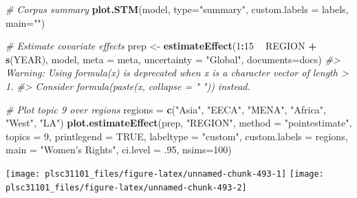 \documentclass[
]{book}
\newenvironment{Shaded}{\begin{snugshade}}{\end{snugshade}}
\newcommand{\CommentTok}[1]{\textcolor[rgb]{0.56,0.35,0.01}{\textit{#1}}}
\newcommand{\DataTypeTok}[1]{\textcolor[rgb]{0.13,0.29,0.53}{#1}}
\newcommand{\DecValTok}[1]{\textcolor[rgb]{0.00,0.00,0.81}{#1}}
\newcommand{\FloatTok}[1]{\textcolor[rgb]{0.00,0.00,0.81}{#1}}
\newcommand{\KeywordTok}[1]{\textcolor[rgb]{0.13,0.29,0.53}{\textbf{#1}}}
\newcommand{\NormalTok}[1]{#1}
\newcommand{\OperatorTok}[1]{\textcolor[rgb]{0.81,0.36,0.00}{\textbf{#1}}}
\newcommand{\OtherTok}[1]{\textcolor[rgb]{0.56,0.35,0.01}{#1}}
\newcommand{\StringTok}[1]{\textcolor[rgb]{0.31,0.60,0.02}{#1}}
\begin{document}
\begin{Shaded}
\begin{Highlighting}[]
\CommentTok{# Corpus summary}
\KeywordTok{plot.STM}\NormalTok{(model, }\DataTypeTok{type=}\StringTok{"summary"}\NormalTok{, }\DataTypeTok{custom.labels =}\NormalTok{ labels, }\DataTypeTok{main=}\StringTok{""}\NormalTok{)}

\CommentTok{# Estimate covariate effects}
\NormalTok{prep <-}\StringTok{ }\KeywordTok{estimateEffect}\NormalTok{(}\DecValTok{1}\OperatorTok{:}\DecValTok{15} \OperatorTok{~}\StringTok{ }\NormalTok{REGION }\OperatorTok{+}\StringTok{ }\KeywordTok{s}\NormalTok{(YEAR), model, }\DataTypeTok{meta =}\NormalTok{ meta, }\DataTypeTok{uncertainty =} \StringTok{"Global"}\NormalTok{, }\DataTypeTok{documents=}\NormalTok{docs)}
\CommentTok{#> Warning: Using formula(x) is deprecated when x is a character vector of length > 1.}
\CommentTok{#>   Consider formula(paste(x, collapse = " ")) instead.}

\CommentTok{# Plot topic 9 over regions}
\NormalTok{regions =}\StringTok{ }\KeywordTok{c}\NormalTok{(}\StringTok{"Asia"}\NormalTok{, }\StringTok{"EECA"}\NormalTok{, }\StringTok{"MENA"}\NormalTok{, }\StringTok{"Africa"}\NormalTok{, }\StringTok{"West"}\NormalTok{, }\StringTok{"LA"}\NormalTok{)}
\KeywordTok{plot.estimateEffect}\NormalTok{(prep, }\StringTok{"REGION"}\NormalTok{, }\DataTypeTok{method =} \StringTok{"pointestimate"}\NormalTok{, }\DataTypeTok{topics =} \DecValTok{9}\NormalTok{, }\DataTypeTok{printlegend =} \OtherTok{TRUE}\NormalTok{, }\DataTypeTok{labeltype =} \StringTok{"custom"}\NormalTok{, }\DataTypeTok{custom.labels =}\NormalTok{ regions, }\DataTypeTok{main =} \StringTok{"Women's Rights"}\NormalTok{, }\DataTypeTok{ci.level =} \FloatTok{.95}\NormalTok{, }\DataTypeTok{nsims=}\DecValTok{100}\NormalTok{)}
\end{Highlighting}
\end{Shaded}

\begin{center}\texttt{[image: plsc31101\_files/figure-latex/unnamed-chunk-493-1]} \texttt{[image: plsc31101\_files/figure-latex/unnamed-chunk-493-2]} \end{center}
\end{document}
